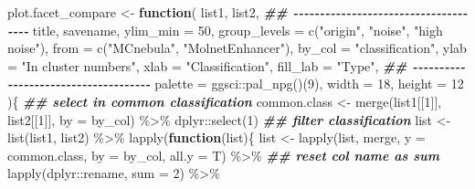 \documentclass[
]{article}
\newenvironment{Shaded}{\begin{snugshade}}{\end{snugshade}}
\newcommand{\AttributeTok}[1]{\textcolor[rgb]{0.77,0.63,0.00}{#1}}
\newcommand{\ControlFlowTok}[1]{\textcolor[rgb]{0.13,0.29,0.53}{\textbf{#1}}}
\newcommand{\DecValTok}[1]{\textcolor[rgb]{0.00,0.00,0.81}{#1}}
\newcommand{\DocumentationTok}[1]{\textcolor[rgb]{0.56,0.35,0.01}{\textbf{\textit{#1}}}}
\newcommand{\FunctionTok}[1]{\textcolor[rgb]{0.00,0.00,0.00}{#1}}
\newcommand{\NormalTok}[1]{#1}
\newcommand{\OtherTok}[1]{\textcolor[rgb]{0.56,0.35,0.01}{#1}}
\newcommand{\SpecialCharTok}[1]{\textcolor[rgb]{0.00,0.00,0.00}{#1}}
\newcommand{\StringTok}[1]{\textcolor[rgb]{0.31,0.60,0.02}{#1}}
\begin{document}
\begin{Shaded}
\begin{Highlighting}[]
\NormalTok{plot.facet\_compare }\OtherTok{\textless{}{-}} 
  \ControlFlowTok{function}\NormalTok{(}
\NormalTok{           list1,}
\NormalTok{           list2,}
           \DocumentationTok{\#\# {-}{-}{-}{-}{-}{-}{-}{-}{-}{-}{-}{-}{-}{-}{-}{-}{-}{-}{-}{-}{-}{-}{-}{-}{-}{-}{-}{-}{-}{-}{-}{-}{-}{-}{-}{-}{-} }
\NormalTok{           title,}
\NormalTok{           savename,}
           \AttributeTok{ylim\_min =} \DecValTok{50}\NormalTok{,}
           \AttributeTok{group\_levels =} \FunctionTok{c}\NormalTok{(}\StringTok{"origin"}\NormalTok{, }\StringTok{"noise"}\NormalTok{, }\StringTok{"high noise"}\NormalTok{), }
           \AttributeTok{from =} \FunctionTok{c}\NormalTok{(}\StringTok{"MCnebula"}\NormalTok{, }\StringTok{"MolnetEnhancer"}\NormalTok{),}
           \AttributeTok{by\_col =} \StringTok{"classification"}\NormalTok{,}
           \AttributeTok{ylab =} \StringTok{"In cluster numbers"}\NormalTok{,}
           \AttributeTok{xlab =} \StringTok{"Classification"}\NormalTok{,}
           \AttributeTok{fill\_lab =} \StringTok{"Type"}\NormalTok{,}
           \DocumentationTok{\#\# {-}{-}{-}{-}{-}{-}{-}{-}{-}{-}{-}{-}{-}{-}{-}{-}{-}{-}{-}{-}{-}{-}{-}{-}{-}{-}{-}{-}{-}{-}{-}{-}{-}{-}{-}{-}{-} }
           \AttributeTok{palette =}\NormalTok{ ggsci}\SpecialCharTok{::}\FunctionTok{pal\_npg}\NormalTok{()(}\DecValTok{9}\NormalTok{),}
           \AttributeTok{width =} \DecValTok{18}\NormalTok{,}
           \AttributeTok{height =} \DecValTok{12}
\NormalTok{           )\{}
    \DocumentationTok{\#\# select in common classification}
\NormalTok{    common.class }\OtherTok{\textless{}{-}} \FunctionTok{merge}\NormalTok{(list1[[}\DecValTok{1}\NormalTok{]], list2[[}\DecValTok{1}\NormalTok{]], }\AttributeTok{by =}\NormalTok{ by\_col) }\SpecialCharTok{\%\textgreater{}\%} 
\NormalTok{      dplyr}\SpecialCharTok{::}\FunctionTok{select}\NormalTok{(}\DecValTok{1}\NormalTok{)}
    \DocumentationTok{\#\# filter classification}
\NormalTok{    list }\OtherTok{\textless{}{-}} \FunctionTok{list}\NormalTok{(list1, list2) }\SpecialCharTok{\%\textgreater{}\%} 
      \FunctionTok{lapply}\NormalTok{(}\ControlFlowTok{function}\NormalTok{(list)\{}
\NormalTok{               list }\OtherTok{\textless{}{-}} \FunctionTok{lapply}\NormalTok{(list, merge, }\AttributeTok{y =}\NormalTok{ common.class, }\AttributeTok{by =}\NormalTok{ by\_col, }\AttributeTok{all.y =}\NormalTok{ T) }\SpecialCharTok{\%\textgreater{}\%} 
                 \DocumentationTok{\#\# reset col name as sum}
                 \FunctionTok{lapply}\NormalTok{(dplyr}\SpecialCharTok{::}\NormalTok{rename, }\AttributeTok{sum =} \DecValTok{2}\NormalTok{) }\SpecialCharTok{\%\textgreater{}\%} 

\end{Highlighting}
\end{Shaded}
\end{document}
